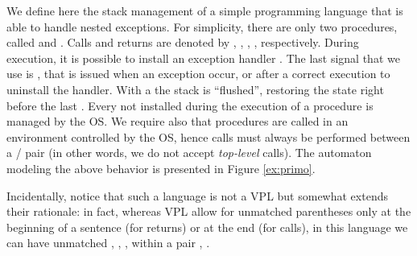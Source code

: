 \documentclass[10pt,a4paper,runningheads]{llncs}
\begin{document}
\begin{example}\label{ex:except}
  We define here the stack management of a simple programming language
  that is able to handle nested exceptions. For simplicity, there are
  only two procedures, called  and . Calls and returns are
  denoted by , , , , respectively.
  During execution, it is possible to install an exception handler
  . The last signal that we use is , that is issued when an
  exception occur, or after a correct execution to uninstall the
  handler. With a  the stack is ``flushed'', restoring the state
  right before the last .  
  Every  not installed during the
  execution of a procedure is managed by the OS. We require also that
  procedures are called in an environment controlled by the OS, hence
  calls must always be performed between a / pair (in
  other words, we do not accept {\em top-level} calls). The automaton
  modeling the above behavior is
  presented in Figure \ref{ex:primo}.


Incidentally, notice that such a language is not a VPL but somewhat
extends their rationale: in fact, whereas VPL allow for unmatched
parentheses only at the beginning of a sentence (for returns) or at
the end (for calls), in this language we can have unmatched , ,
,  within a pair , .
\end{example}
\end{document}
